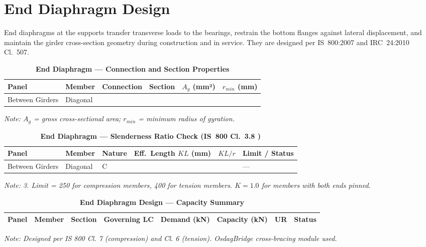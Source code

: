 \documentclass[12pt,a4paper]{report}
\numberwithin{table}{chapter}
\numberwithin{figure}{chapter}
\begin{document}
\section{End Diaphragm Design}
\label{sec:end-diaphragm}

End diaphragms at the supports transfer transverse loads to the bearings, restrain the bottom flanges against lateral displacement, and maintain the girder cross-section geometry during construction and in service. They are designed per IS~800:2007 and IRC~24:2010 Cl.~507.

\vspace{1em}

\vspace{0.4em}
\noindent
\setlength{\tabcolsep}{4pt}
\setlength{\LTleft}{0pt}
\setlength{\LTright}{\fill}

\begin{longtable}{|C{2.0cm}|L{2.0cm}|L{2.2cm}|C{2.5cm}|C{2.0cm}|C{2.0cm}|}
\caption{\textbf{End Diaphragm --- Connection and Section Properties}}\\
\hline
\textbf{Panel} & \textbf{Member} & \textbf{Connection} & \textbf{Section} & \textbf{$A_g$ (mm²)} & \textbf{$r_{min}$ (mm)} \\[6pt]
\hline
Between Girders & Diagonal &  &  &  &  \\[6pt]
\hline
\end{longtable}
\noindent\textit{Note: $A_g$ = gross cross-sectional area; $r_{min}$ = minimum radius of gyration.}

\vspace{1em}
\begin{longtable}{|C{2.2cm}|L{2.2cm}|L{2.5cm}|C{2.5cm}|C{2.5cm}|>{\centering\arraybackslash}p{3.6cm}|}
\caption{\textbf{End Diaphragm --- Slenderness Ratio Check (IS~800 Cl.~3.8 )}}\\
\hline
\textbf{Panel} & \textbf{Member} & \textbf{Nature} & \textbf{Eff.\ Length $KL$ (mm)} & \textbf{$KL/r$} & \textbf{Limit / Status} \\[6pt]
\hline
Between Girders & Diagonal & C &  &  &  ---  \\[6pt]
\hline
\end{longtable}
\noindent\textit{Note:  3. Limit = 250 for compression members, 400 for tension members. $K = 1.0$ for members with both ends pinned.}

\vspace{1em}

\begin{longtable}{|C{2.0cm}|L{1.8cm}|C{2.2cm}|C{3.0cm}|C{1.8cm}|C{1.8cm}|C{1.2cm}|C{1.8cm}|}
\caption{\textbf{End Diaphragm Design --- Capacity Summary}}\\
\hline
\textbf{Panel} & \textbf{Member} & \textbf{Section} & \textbf{Governing LC} & \textbf{Demand (kN)} & \textbf{Capacity (kN)} & \textbf{UR} & \textbf{Status} \\[6pt]
\hline

\end{longtable}
\noindent\textit{Note: Designed per IS 800 Cl. 7 (compression) and Cl. 6 (tension). OsdagBridge cross-bracing module used.}
\end{document}
